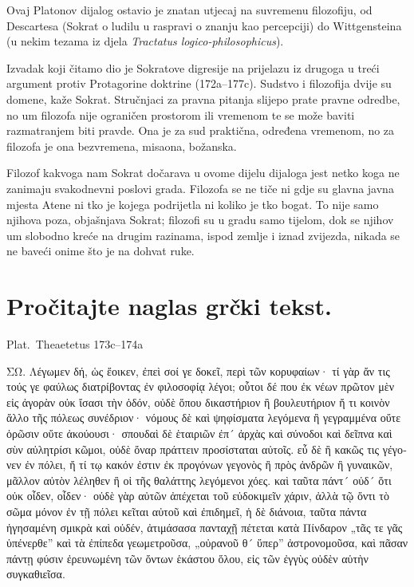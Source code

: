 Ovaj Platonov dijalog ostavio je znatan utjecaj na suvremenu filozofiju, od Descartesa (Sokrat o ludilu u raspravi o znanju kao percepciji) do Wittgensteina (u nekim tezama iz djela \textit{Tractatus logico-philosophicus}).

Izvadak koji čitamo dio je Sokratove digresije na prijelazu iz drugoga u treći argument protiv Protagorine doktrine (172a–177c). Sudstvo i filozofija dvije su domene, kaže Sokrat. Stručnjaci za pravna pitanja slijepo prate pravne odredbe, no um filozofa nije ograničen prostorom ili vremenom te se može baviti razmatranjem biti pravde. Ona je za sud praktična, određena vremenom, no za filozofa je ona bezvremena, misaona, božanska. 

Filozof kakvoga nam Sokrat dočarava u ovome dijelu dijaloga jest netko koga ne zanimaju svakodnevni poslovi grada. Filozofa se ne tiče ni gdje su glavna javna mjesta Atene ni tko je kojega podrijetla ni koliko je tko bogat. To nije samo njihova poza, objašnjava Sokrat; filozofi su u gradu samo tijelom, dok se njihov um slobodno kreće na drugim razinama, ispod zemlje i iznad zvijezda, nikada se ne baveći onime što je na dohvat ruke.


\newpage

\section*{Pročitajte naglas grčki tekst.}

Plat.\ Theaetetus 173c–174a


\medskip


{\large

\begin{greek}

\noindent ΣΩ. Λέγωμεν δή, ὡς ἔοικεν, ἐπεὶ σοί γε δοκεῖ, περὶ τῶν κορυφαίων· τί γὰρ ἄν τις τούς γε φαύλως διατρίβοντας ἐν φιλοσοφίᾳ λέγοι; οὗτοι δέ που ἐκ νέων πρῶτον μὲν εἰς ἀγορὰν οὐκ ἴσασι τὴν ὁδόν, οὐδὲ ὅπου δικαστήριον ἢ βουλευτήριον ἤ τι κοινὸν ἄλλο τῆς πόλεως συνέδριον· νόμους δὲ καὶ ψηφίσματα λεγόμενα ἢ γεγραμμένα οὔτε ὁρῶσιν οὔτε ἀκούουσι· σπουδαὶ δὲ ἑταιριῶν ἐπ´ ἀρχὰς καὶ σύνοδοι καὶ δεῖπνα καὶ σὺν αὐλητρίσι κῶμοι, οὐδὲ ὄναρ πράττειν προσίσταται αὐτοῖς. εὖ δὲ ἢ κακῶς τις γέγονεν ἐν πόλει, ἤ τί τῳ κακόν ἐστιν ἐκ προγόνων γεγονὸς ἢ πρὸς ἀνδρῶν ἢ γυναικῶν, μᾶλλον αὐτὸν λέληθεν ἢ οἱ τῆς θαλάττης λεγόμενοι χόες. καὶ ταῦτα πάντ´ οὐδ´ ὅτι οὐκ οἶδεν, οἶδεν· οὐδὲ γὰρ αὐτῶν ἀπέχεται τοῦ εὐδοκιμεῖν χάριν, ἀλλὰ τῷ ὄντι τὸ σῶμα μόνον ἐν τῇ πόλει κεῖται αὐτοῦ καὶ ἐπιδημεῖ, ἡ δὲ διάνοια, ταῦτα πάντα ἡγησαμένη σμικρὰ καὶ οὐδέν, ἀτιμάσασα πανταχῇ πέτεται κατὰ Πίνδαρον „τᾶς τε γᾶς ὑπένερθε” καὶ τὰ ἐπίπεδα γεωμετροῦσα, „οὐρανοῦ θ´ ὕπερ” ἀστρονομοῦσα, καὶ πᾶσαν πάντῃ φύσιν ἐρευνωμένη τῶν ὄντων ἑκάστου ὅλου, εἰς τῶν ἐγγὺς οὐδὲν αὑτὴν συγκαθιεῖσα.

\end{greek}

}


